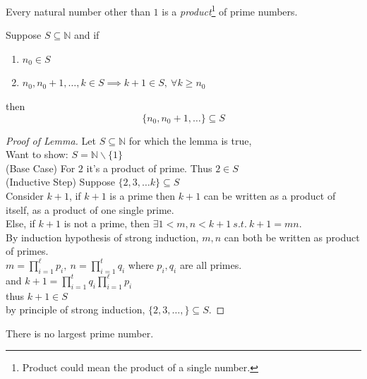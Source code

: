\documentclass[11pt]{article}
\begin{document}
	\begin{lemma}
		Every natural number other than $1$ is a \emph{product}\footnote{Product could mean the product of a single number.} of prime numbers.
	\end{lemma}
	
	\begin{theorem}
		Suppose $S \subseteq \mathbb{N}$ and if 
		\begin{enumerate}
			\item $n_0 \in S$
			\item $n_0, n_0 + 1, \dots, k \in S \implies k+1 \in S,\ \forall k \geq n_0$
		\end{enumerate}
		then 
		\[
			\{n_0, n_0 + 1, \dots\} \subseteq S
		\]
	\end{theorem}
	\begin{proof} [Proof of Lemma]
		Let $S \subseteq \mathbb{N}$ for which the lemma is true, \\
		Want to show: $S = \mathbb{N} \backslash \{1\}$ \\
		(Base Case) For $2$ it's a product of prime. Thus $2 \in S$ \\
		(Inductive Step) Suppose $\{2,3, \dots k\} \subseteq S$ \\
		Consider $k+1$, if $k+1$ is a prime then $k+1$ can be written as a product of itself, as a product of one single prime.\\
		Else, if $k+1$ is not a prime, then $\exists 1<m,n<k+1\ s.t.\ k+1 = mn$.\\
		By induction hypothesis of strong induction, $m,n$ can both be written as product of primes. \\
		$m = \prod_{i=1}^\ell {p_i},\ n = \prod_{i=1}^t {q_i}$ where $p_i, q_i$ are all primes.\\
		and $k+1 = \prod_{i=1}^t{q_i}\prod_{i=1}^\ell {p_i}$ \\
		thus $k+1 \in S$ \\ 
		by principle of strong induction, $\{2,3,\dots,\} \subseteq S$.
	\end{proof}
	
	\begin{theorem}
		There is no largest prime number.
	\end{theorem}
	
\end{document}
